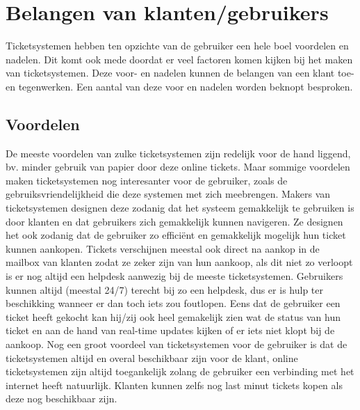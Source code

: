 
\section{Belangen van klanten/gebruikers}
Ticketsystemen hebben ten opzichte van de gebruiker een hele boel voordelen en nadelen. Dit komt ook mede doordat er veel factoren komen kijken bij het maken van ticketsystemen. 
Deze voor- en nadelen kunnen de belangen van een klant toe- en tegenwerken. Een aantal van deze voor en nadelen worden beknopt besproken. 

\subsection{Voordelen}
De meeste voordelen van zulke ticketsystemen zijn redelijk voor de hand liggend, bv. minder gebruik van papier door deze online tickets.
Maar sommige voordelen maken ticketsystemen nog interesanter voor de gebruiker, zoals de gebruiksvriendelijkheid die deze systemen met zich meebrengen.
Makers van ticketsystemen designen deze zodanig dat het systeem gemakkelijk te gebruiken is door klanten en dat gebruikers zich gemakkelijk kunnen navigeren.
Ze designen het ook zodanig dat de gebruiker zo efficiënt en gemakkelijk mogelijk hun ticket kunnen aankopen. Tickets verschijnen meestal ook direct na aankop 
in de mailbox van klanten zodat ze zeker zijn van hun aankoop, als dit niet zo verloopt is er nog altijd een helpdesk aanwezig bij de meeste ticketsystemen. 
Gebruikers kunnen altijd (meestal 24/7) terecht bij zo een helpdesk, dus er is hulp ter beschikking wanneer er dan toch iets zou foutlopen.
Eens dat de gebruiker een ticket heeft gekocht kan hij/zij ook heel gemakelijk zien wat de status van hun ticket en aan de hand van real-time updates kijken of er iets niet klopt bij de aankoop.
Nog een groot voordeel van ticketsystemen voor de gebruiker is dat de ticketsystemen altijd en overal beschikbaar zijn voor de klant,
online ticketsystemen zijn altijd toegankelijk zolang de gebruiker een verbinding met het internet heeft natuurlijk. 
Klanten kunnen zelfs nog last minut tickets kopen als deze nog beschikbaar zijn.

